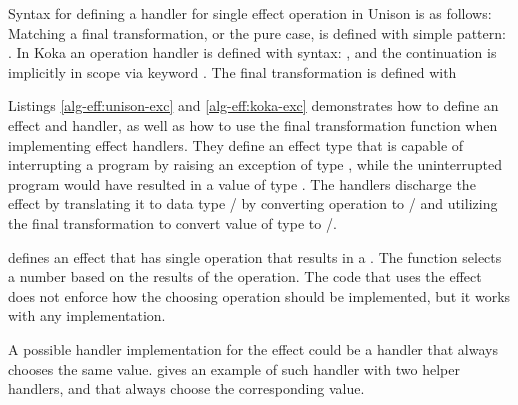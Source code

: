 Syntax for defining a handler for single effect operation in Unison is as follows:
\\
Matching a final transformation, or the pure case, is defined with simple pattern:
.
In Koka an operation handler is defined with syntax: , and the continuation is implicitly in scope via keyword . The final transformation is defined with 





Listings \ref{alg-eff:unison-exc} and \ref{alg-eff:koka-exc} demonstrates how to define an effect and handler, as well as how to use the final transformation function when implementing effect handlers. They define an effect type  that is capable of interrupting a program by raising an exception of type , while the uninterrupted program would have resulted in a value of type . The handlers discharge the effect by translating it to data type / by converting  operation to / and utilizing the final transformation to convert value of type  to /.

 defines an effect  that has single operation  that results in a . The function  selects a number based on the results of the  operation. The code that uses the effect does not enforce how the choosing operation should be implemented, but it works with any implementation.



A possible handler implementation for the  effect could be a handler that always chooses the same  value.  gives an example of such handler with two helper handlers,  and  that always choose the corresponding value.



